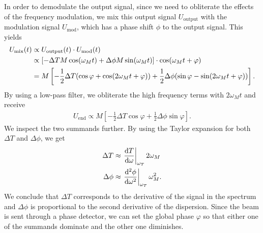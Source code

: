 In order to demodulate the output signal, since we need to obliterate the effects of the frequency modulation, we mix this output signal $U_\text{output}$ with the modulation signal $U_\text{mod}$, which has a phase shift $\phi$ to the output signal. This yields
\begin{align}
U_\text{mix}(t)&\propto U_\text{output}(t)\cdot U_\text{mod}(t)\notag\\
&\propto\left[-\Delta TM\cos(\omega_M t)+\Delta \phi M\sin(\omega_M t)\right]\cdot \cos(\omega_M t+\varphi)\notag\\
&=M\left[-\frac{1}{2}\Delta T(\cos\varphi+\cos(2\omega_M t+\varphi))+\frac{1}{2}\Delta\phi(\sin\varphi-\sin(2\omega_M t+\varphi))\right].
\end{align}
By using a low-pass filter, we obliterate the high frequency terms with $2\omega_M t$ and receive
\begin{align}
U_\text{end}\propto M\left[-\frac{1}{2}\Delta T\cos\varphi+\frac{1}{2}\Delta\phi\sin\varphi\right].
\end{align}
We inspect the two summands further. By using the Taylor expansion for both $\Delta T$ and $\Delta\phi$, we get
\begin{align}
\Delta T&\approx\left.\frac{\mathrm{d} T}{\mathrm{d}\omega}\right|_{\omega_T}2\omega_M\\
\Delta\phi&\approx\left.\frac{\mathrm{d}^2\phi}{\mathrm{d}\omega^2}\right|_{\omega_T}\omega_M^2.
\end{align}
We conclude that $\Delta T$ corresponds to the derivative of the signal in the spectrum and $\Delta \phi$ is proportional to the second derivative of the dispersion. Since the beam is sent through a phase detector, we can set the global phase $\varphi$ so that either one of the summands dominate and the other one diminishes.
